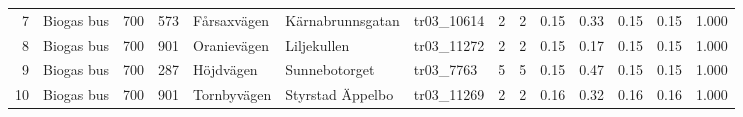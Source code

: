 \begin{table}[t]
{\begin{tabular}{
r
>{\raggedright\arraybackslash}p{1.7cm}
r
r
>{\raggedright\arraybackslash}p{2.1cm}
>{\raggedright\arraybackslash}p{2.1cm}
>{\raggedright\arraybackslash}p{1.7cm}
r
r
r
r
r
r
r
}
7 & Biogas bus & 700 & 573 & Fårsaxvägen & Kärnabrunnsgatan & tr03\_10614 & 2 & 2 & 0.15 & 0.33 & 0.15 & 0.15 & 1.000 \\
8 & Biogas bus & 700 & 901 & Oranievägen & Liljekullen & tr03\_11272 & 2 & 2 & 0.15 & 0.17 & 0.15 & 0.15 & 1.000 \\
9 & Biogas bus & 700 & 287 & Höjdvägen & Sunnebotorget & tr03\_7763 & 5 & 5 & 0.15 & 0.47 & 0.15 & 0.15 & 1.000 \\
10 & Biogas bus & 700 & 901 & \cellcolor{red!20}Tornbyvägen & \cellcolor{red!20}Styrstad Äppelbo & tr03\_11269 & 2 & 2 & 0.16 & 0.32 & 0.16 & 0.16 & 1.000 \\
\bottomrule
\end{tabular}%
}
\end{table}

\begin{table}[H]
\centering
\small
\setlength{\tabcolsep}{1.4pt}
\renewcommand{\arraystretch}{1.15}
\caption{Top 10 grouped trips with the highest distance-based CO$_2$e emissions. Segment-level emissions are calculated using a single distance-based consumption and emission factor and then aggregated by grouped trip.}
\label{tab:top10_single_factor_trip_experiment}
\end{table}
